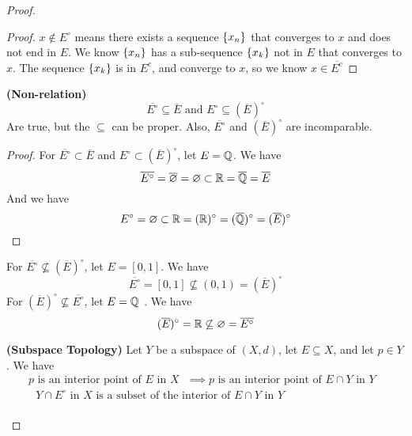 \documentclass{report}
\begin{document}
\begin{proof}
\begin{proof}
$x\not \in E^\circ $ means there exists a sequence $\{ x_n \}$ that converges to $x$ and does not end in  $E$. We know $\{ x_n \}$ has a sub-sequence $\{ x_k \}$ not in $E$ that converges to $x$. The sequence $\{ x_k \}$ is in $E^c$, and converge to $x$, so we know  $x\in \overline{E^c}$
\end{proof}
\begin{theorem}
\label{3.3.7}
\textbf{(Non-relation)}  
\begin{equation}
  \overline{E^\circ }\subseteq \overline{E}\text{ and }E^\circ \subseteq (\overline{E})^\circ 
\end{equation}
Are true, but the $\subseteq$ can be proper. Also, $\overline{E^\circ }$ and $(\overline{E})^\circ $ are incomparable.
\end{theorem}
\begin{proof}
For $\overline{E^\circ }\subset \overline{E}$ and $E^\circ \subset (\overline{E})^\circ $, let $E=\mathbb{Q}$. We have
 \begin{equation}
\overline{E^\circ }=\overline{\varnothing}=\varnothing \subset \mathbb{R}=\overline{\mathbb{Q}}=\overline{E}
\end{equation}
And we have
\begin{equation}
E^\circ = \varnothing \subset \mathbb{R}=(\mathbb{R})^\circ  = (\overline{\mathbb{Q}})^\circ = (\overline{E})^\circ 
\end{equation}
\end{proof}
For $\overline{E^\circ }\not \subseteq (\overline{E})^\circ $, let $E=[0,1]$. We have
\begin{equation}
\overline{E^\circ }=[0,1]\not\subseteq (0,1)=(\overline{E})^\circ 
\end{equation}
For $(\overline{E})^\circ \not\subseteq \overline{E^\circ }$, let $E=\mathbb{Q}$ . We have
\begin{equation}
  (\overline{E})^\circ =\mathbb{R} \not\subseteq \varnothing= \overline{E^\circ }
\end{equation}
\begin{theorem}
\label{6.3.2}
\textbf{(Subspace Topology)} Let $Y$ be a subspace of $(X,d)$, let $E\subseteq X$, and let $p\in  Y$. We have
\begin{gather}
p\text{ is an interior point of $E$ in $X$ }\implies p\text{ is an interior point of $E\cap Y$ in $Y$ } \\
\text{ $Y\cap E^\circ $ in $X$ is a subset of the interior of $E\cap Y$ in $Y$ }\\

\end{gather}
\end{theorem}
\end{proof}
\end{document}
